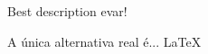 \documentclass[aspect=43,14pt]{beamer}
\begin{document}
{%
\begin{frame}[b]
    \begin{center}
        \Huge Best description evar!
    \end{center}
\end{frame}
}

\begin{frame}
    \begin{center}
        A única alternativa real é...
        \vfill
        \Huge \LaTeX
    \end{center}
\end{frame}
\end{document}
